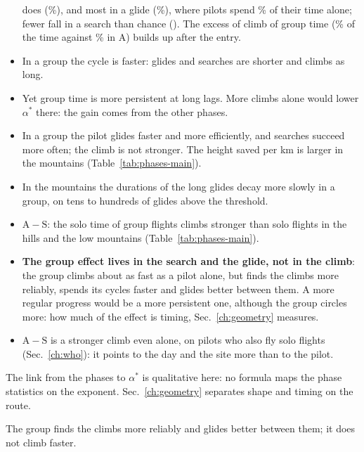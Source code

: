 \documentclass[10pt,a4paper]{article}
\newcommand{\A}{\mathrm{A}}
\newcommand{\Sl}{\mathrm{S}}
\newcommand{\Home}{\item[\textcolor{answer}{\textbf{Take home.}}]\color{black}}
\newcommand{\Ded}{\item[\textcolor{answer}{\textbf{Deduction.}}]\color{black}}
\newcommand{\Com}{\item[\textcolor{black}{\textbf{Comment.}}]\color{black}}
\newenvironment{step}{\begin{description}[leftmargin=0pt, itemsep=7pt, topsep=8pt]}{\end{description}}
\begin{document}
\begin{step}
\begin{itemize}
    does (\EnterBaseClimbAll\%), and most in a glide (\EnterShareGlideAll\%), where pilots spend \EnterBaseGlideAll\% of their time
    alone; fewer fall in a search than chance (\EnterRatioSearchAll). The excess of climb of group time
    (\PhShareClimbGAll\% of the time against \PhShareClimbAAll\% in $\A$) builds up after the entry.
  \item In a group the cycle is faster: glides and searches are shorter and climbs as long.
  \item Yet group time is more persistent at long lags. More climbs alone would lower $\alpha^*$ there: the gain
    comes from the other phases.
  \item In a group the pilot glides faster and more efficiently, and searches succeed more often; the climb is not
    stronger. The height saved per km is larger in the mountains (Table~\ref{tab:phases-main}).
  \item In the mountains the durations of the long glides decay more slowly in a group, on tens to hundreds of
    glides above the threshold.
  \item $\A-\Sl$: the solo time of group flights climbs stronger than solo flights in the hills and the low
    mountains (Table~\ref{tab:phases-main}).
  \end{itemize}
\Ded\mbox{}
  \begin{itemize}
  \item \textbf{The group effect lives in the search and the glide, not in the climb}: the group climbs about as
    fast as a pilot alone, but finds the climbs more reliably, spends its cycles faster and glides better between
    them. A more regular progress would be a more persistent one, although the group circles more: how much of the
    effect is timing, Sec.~\ref{ch:geometry} measures.
  \item $\A-\Sl$ is a stronger climb even alone, on pilots who also fly solo flights (Sec.~\ref{ch:who}): it points
    to the day and the site more than to the pilot.
  \end{itemize}
\Com The link from the phases to $\alpha^*$ is qualitative here: no formula maps the phase statistics on the
  exponent. Sec.~\ref{ch:geometry} separates shape and timing on the route.
\Home The group finds the climbs more reliably and glides better between them; it does not climb faster.
\end{step}
\end{document}
